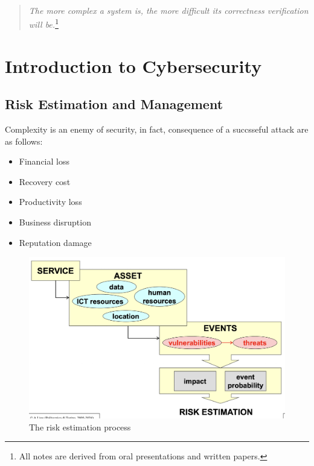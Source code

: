 \

\vfill

\begin{center}
    \begin{quotation}
    \centering
    \textit{The more complex a system is, the more difficult its correctness verification will be.}\footnote{ \textsf{All notes are derived from oral presentations and written papers.}}
\end{quotation}
\end{center}
\vfill

\chapter{Introduction to Cybersecurity}


\section{Risk Estimation and Management}
\cite{01_introduction}
Complexity is an enemy of security, in fact, consequence of a succsseful attack are as follows:
\begin{itemize}
    \item Financial loss 
    \item Recovery cost
    \item Productivity loss 
    \item Business disruption
    \item Reputation damage
\end{itemize}

\begin{figure}[H]
    \includegraphics[width=\linewidth]{Images/Introduction/riskEvaluation.png}
    \caption{The risk estimation process}
\end{figure}

